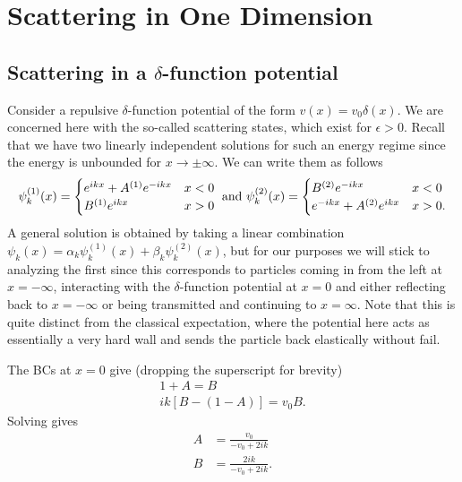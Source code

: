 \chapter{Scattering in One Dimension}

\section{Scattering in a $\delta$-function potential}

Consider a repulsive $\delta$-function potential of the form $v(x) = v_0 \delta(x)$.
We are concerned here with the so-called scattering states, which exist for $\epsilon > 0$.
Recall that we have two linearly independent solutions for such an energy regime since the energy is unbounded for $x \rightarrow \pm \infty$.
We can write them as follows
\begin{eqnarray}
    \psi_{k}^{(1)}(x) = \begin{cases}
        e^{ikx} + A^{(1)} e^{-ikx} & x < 0 \\
        B^{(1)} e^{ikx} & x > 0
    \end{cases}
    ~{\rm and}~
    \psi_{k}^{(2)}(x) = \begin{cases}
        B^{(2)} e^{-ikx} & x < 0 \\
        e^{-ikx} + A^{(2)} e^{ikx} & x > 0
    .\end{cases}
\end{eqnarray}
A general solution is obtained by taking a linear combination $\psi_{k}(x) = \alpha_{k} \psi_{k}^{(1)}(x) + \beta_{k} \psi_{k}^{(2)}(x)$, but for our purposes we will stick to analyzing the first since this corresponds to particles coming in from the left at $x = -\infty$, interacting with the $\delta$-function potential at $x = 0$ and either reflecting back to $x = -\infty$ or being transmitted and continuing to $x = \infty$.
Note that this is quite distinct from the classical expectation, where the potential here acts as essentially a very hard wall and sends the particle back elastically without fail.

The BCs at $x = 0$ give (dropping the superscript for brevity)
\begin{gather}
    1 + A = B \\
    ik[B - (1 - A)] = v_0 B
.\end{gather}
Solving gives
\begin{align}
    A &= \frac{v_0}{-v_0 + 2ik} \\
    B &= \frac{2ik}{-v_0 + 2ik}
.\end{align}

